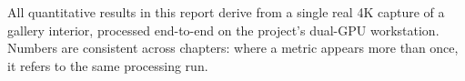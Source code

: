 \begin{technote}
All quantitative results in this report derive from a single real 4K capture of a gallery interior, processed end-to-end on the project's dual-GPU workstation. Numbers are consistent across chapters: where a metric appears more than once, it refers to the same processing run.
\end{technote}
